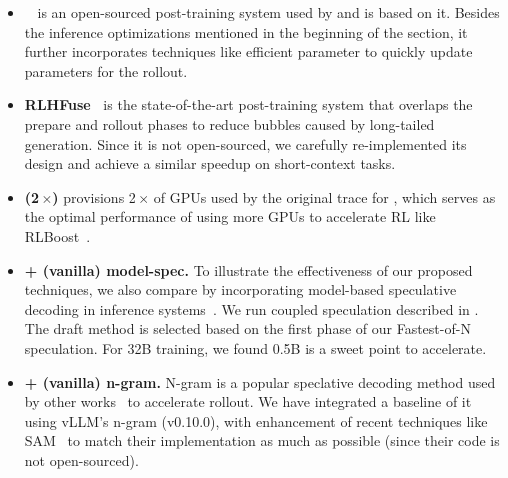 \begin{itemize}[leftmargin=*,leftmargin=10pt,itemindent=0pt]
    \itemsep0.5em
    \item \textbf{\verl~\cite{DBLP:conf/eurosys/ShengZYWZZPL025}}
    is an open-sourced post-training system used by {\company}
    and {\sys} is based on it.
    Besides the inference optimizations mentioned in the beginning of the section,
    it further incorporates techniques like efficient parameter
    to quickly update parameters for the rollout. \\[-10pt]

    \item \textbf{RLHFuse~\cite{rlhfuse}} 
    is the state-of-the-art post-training system that overlaps
    the prepare and rollout phases to reduce bubbles caused by
    long-tailed generation.
    Since it is not open-sourced, we carefully re-implemented its design
    and achieve a similar speedup on short-context tasks. 
    \\[-18pt]

    \item \textbf{{\verl} (2\,$\times$)} 
    provisions 2\,$\times$ of GPUs used by the original trace for {\verl}, 
    which serves as the optimal performance of using more GPUs 
    to accelerate RL like RLBoost~\cite{rlboost}.  \\[-18pt]

    \item \textbf{{\verl} + (vanilla) model-spec.}
    To illustrate the effectiveness of our proposed techniques,
    we also compare {\verl} by incorporating model-based speculative
    decoding in inference systems~\cite{spd,specinfer}.
    We run coupled speculation described in \textsection{\ref{sec:overview}}.
    The draft method is selected based on the first phase of our Fastest-of-N speculation.
    For 32B training, we found 0.5B is a sweet point to accelerate. \\[-18pt]

    \item \textbf{{\verl} + (vanilla) n-gram.}
    N-gram is a popular speclative decoding method used by other works~\cite{rhymerl,seer}
    to accelerate rollout. 
    We have integrated a baseline of it using vLLM's n-gram (v0.10.0), 
    with enhancement of recent techniques like SAM~\cite{DBLP:conf/acl/HuWZZLCZ25} 
    to match their implementation as much as possible (since their code is not open-sourced). \\[-18pt]


\end{itemize}
